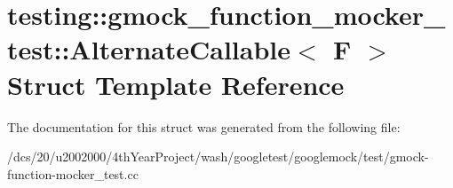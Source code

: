\hypertarget{structtesting_1_1gmock__function__mocker__test_1_1AlternateCallable}{}\section{testing\+:\+:gmock\+\_\+function\+\_\+mocker\+\_\+test\+:\+:Alternate\+Callable$<$ F $>$ Struct Template Reference}
\label{structtesting_1_1gmock__function__mocker__test_1_1AlternateCallable}


The documentation for this struct was generated from the following file\+:\begin{DoxyCompactItemize}
\item 
/dcs/20/u2002000/4th\+Year\+Project/wash/googletest/googlemock/test/gmock-\/function-\/mocker\+\_\+test.\+cc\end{DoxyCompactItemize}
